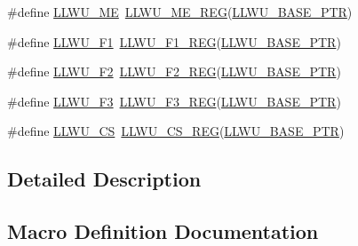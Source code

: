\begin{DoxyCompactItemize}
\item 
\#define \hyperlink{group___l_l_w_u___register___accessor___macros_gabe3a2c1d3bd364f60d4ef36944dd0d7e}{L\+L\+W\+U\+\_\+\+ME}~\hyperlink{group___l_l_w_u___register___accessor___macros_gad2163c47741ae9561ed0cf28003dc06d}{L\+L\+W\+U\+\_\+\+M\+E\+\_\+\+R\+EG}(\hyperlink{group___l_l_w_u___peripheral_ga89c97b9e8756088cb3d8617c022ae6ac}{L\+L\+W\+U\+\_\+\+B\+A\+S\+E\+\_\+\+P\+TR})
\item 
\#define \hyperlink{group___l_l_w_u___register___accessor___macros_ga0b1034b705393cb19dc8bdc643242e0b}{L\+L\+W\+U\+\_\+\+F1}~\hyperlink{group___l_l_w_u___register___accessor___macros_ga3f4c680add377053731e36faf88c85c2}{L\+L\+W\+U\+\_\+\+F1\+\_\+\+R\+EG}(\hyperlink{group___l_l_w_u___peripheral_ga89c97b9e8756088cb3d8617c022ae6ac}{L\+L\+W\+U\+\_\+\+B\+A\+S\+E\+\_\+\+P\+TR})
\item 
\#define \hyperlink{group___l_l_w_u___register___accessor___macros_gaf234482694d2528fddefe57b14eaa942}{L\+L\+W\+U\+\_\+\+F2}~\hyperlink{group___l_l_w_u___register___accessor___macros_ga9824713b71d34e05dd1783c6e0153a3c}{L\+L\+W\+U\+\_\+\+F2\+\_\+\+R\+EG}(\hyperlink{group___l_l_w_u___peripheral_ga89c97b9e8756088cb3d8617c022ae6ac}{L\+L\+W\+U\+\_\+\+B\+A\+S\+E\+\_\+\+P\+TR})
\item 
\#define \hyperlink{group___l_l_w_u___register___accessor___macros_gaaf3f95074e10d498b1522014ab7d5bfe}{L\+L\+W\+U\+\_\+\+F3}~\hyperlink{group___l_l_w_u___register___accessor___macros_ga8369b30780db4c76aa70c8adf1a763fa}{L\+L\+W\+U\+\_\+\+F3\+\_\+\+R\+EG}(\hyperlink{group___l_l_w_u___peripheral_ga89c97b9e8756088cb3d8617c022ae6ac}{L\+L\+W\+U\+\_\+\+B\+A\+S\+E\+\_\+\+P\+TR})
\item 
\#define \hyperlink{group___l_l_w_u___register___accessor___macros_ga1997697f6b1528fedce0281101e589fb}{L\+L\+W\+U\+\_\+\+CS}~\hyperlink{group___l_l_w_u___register___accessor___macros_ga4c0d49cd090e1c221d332b1f1d2dcade}{L\+L\+W\+U\+\_\+\+C\+S\+\_\+\+R\+EG}(\hyperlink{group___l_l_w_u___peripheral_ga89c97b9e8756088cb3d8617c022ae6ac}{L\+L\+W\+U\+\_\+\+B\+A\+S\+E\+\_\+\+P\+TR})
\end{DoxyCompactItemize}


\subsection{Detailed Description}


\subsection{Macro Definition Documentation}
